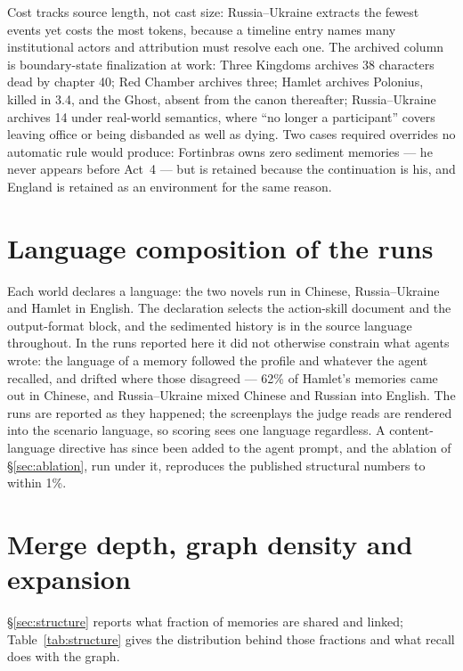 \documentclass{article}
\begin{document}
Cost tracks source length, not cast size: Russia--Ukraine extracts the fewest
events yet costs the most tokens, because a timeline entry names many
institutional actors and attribution must resolve each one. The archived
column is boundary-state finalization at work: Three Kingdoms archives 38
characters dead by chapter 40; Red Chamber archives three; Hamlet archives
Polonius, killed in 3.4, and the Ghost, absent from the canon thereafter;
Russia--Ukraine archives 14 under real-world semantics, where ``no longer a
participant'' covers leaving office or being disbanded as well as dying. Two
cases required overrides no automatic rule would produce: Fortinbras owns zero
sediment memories --- he never appears before Act~4 --- but is retained
because the continuation is his, and England is retained as an environment for
the same reason.

\section{Language composition of the runs}
\label{app:language}

Each world declares a language: the two novels run in Chinese, Russia--Ukraine
and Hamlet in English. The declaration selects the action-skill document and
the output-format block, and the sedimented history is in the source language
throughout. In the runs reported here it did not otherwise constrain what
agents wrote: the language of a memory followed the profile and whatever the
agent recalled, and drifted where those disagreed --- 62\% of Hamlet's
memories came out in Chinese, and Russia--Ukraine mixed Chinese and Russian
into English. The runs are reported as they happened; the screenplays the
judge reads are rendered into the scenario language, so scoring sees one
language regardless. A content-language directive has since been added to the
agent prompt, and the ablation of \S\ref{sec:ablation}, run under it,
reproduces the published structural numbers to within 1\%.

\section{Merge depth, graph density and expansion}
\label{app:structure}

\S\ref{sec:structure} reports what fraction of memories are shared and linked;
Table~\ref{tab:structure} gives the distribution behind those fractions and
what recall does with the graph.

\begin{table}[h]
\centering
\caption{Consensus structure per world at the final stage. ``3+'' counts
entries with three or more witnesses, ``Max'' is the deepest merge,
``Expanded'' the fraction of recalls that returned at least one memory reached
along an affiliated edge, and ``Linked/call'' the mean number of such memories
per expanding call.}
\label{tab:structure}
\resizebox{\textwidth}{!}{}
\end{table}
\end{document}
